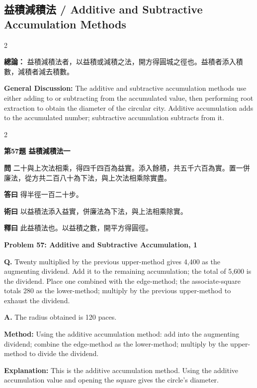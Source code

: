 \documentclass[11pt,a4paper]{article}
\newcommand{\wen}[1]{\noindent\textbf{問} #1\par\smallskip}
\newcommand{\da}[1]{\noindent\textbf{答曰} #1\par\smallskip}
\newcommand{\shu}[1]{\noindent\textbf{術曰} #1\par\smallskip}
\newcommand{\shi}[1]{\noindent\textbf{釋曰} #1\par\smallskip}
\newcommand{\wenE}[1]{\noindent\textbf{Q.} #1\par\smallskip}
\newcommand{\daE}[1]{\noindent\textbf{A.} #1\par\smallskip}
\newcommand{\shuE}[1]{\noindent\textbf{Method:} #1\par\smallskip}
\newcommand{\shiE}[1]{\noindent\textbf{Explanation:} #1\par\smallskip}
\begin{document}
\clearpage

\subsection*{益積減積法 / Additive and Subtractive Accumulation Methods}

\begin{paracol}{2}

\noindent\textbf{總論：} 益積減積法者，以益積或減積之法，開方得圓城之徑也。益積者添入積數，減積者減去積數。

\switchcolumn

\noindent\textbf{General Discussion:} The additive and subtractive accumulation methods use either adding to or subtracting from the accumulated value, then performing root extraction to obtain the diameter of the circular city. Additive accumulation adds to the accumulated number; subtractive accumulation subtracts from it.

\end{paracol}

\bigskip

\begin{paracol}{2}

\noindent\textbf{第57題 益積減積法一}

\wen{二十與上次法相乘，得四千四百為益實。添入餘積，共五千六百為實。置一併廉法，從方共二百八十為下法，與上次法相乘除實盡。}
\da{得半徑一百二十步。}
\shu{以益積法添入益實，併廉法為下法，與上法相乘除實。}
\shi{此益積法也。以益積之數，開平方得圓徑。}

\switchcolumn

\noindent\textbf{Problem 57: Additive and Subtractive Accumulation, 1}

\wenE{Twenty multiplied by the previous upper-method gives 4,400 as the augmenting dividend. Add it to the remaining accumulation; the total of 5,600 is the dividend. Place one combined with the edge-method; the associate-square totals 280 as the lower-method; multiply by the previous upper-method to exhaust the dividend.}
\daE{The radius obtained is 120 paces.}
\shuE{Using the additive accumulation method: add into the augmenting dividend; combine the edge-method as the lower-method; multiply by the upper-method to divide the dividend.}
\shiE{This is the additive accumulation method. Using the additive accumulation value and opening the square gives the circle's diameter.}

\end{paracol}
\end{document}
